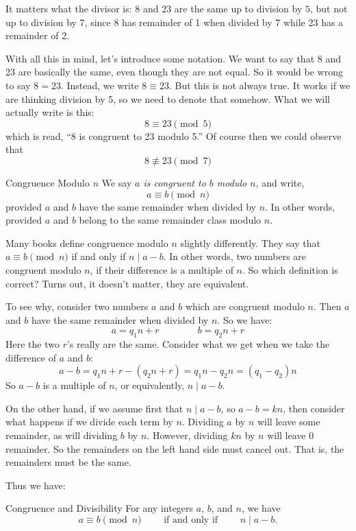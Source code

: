 \documentclass[12pt]{article}
\begin{document}
It matters what the divisor is: $8$ and $23$ are the same up to division by $5$, but not up to division by $7$, since $8$ has remainder of 1 when divided by 7 while 23 has a remainder of 2.  

With all this in mind, let's introduce some notation.  We want to say that $8$ and 23 are basically the same, even though they are not equal.  So it would be wrong to say $8 = 23$.  Instead, we write $8 \equiv 23$.  But this is not always true.  It works if we are thinking division by 5, so we need to denote that somehow.  What we will actually write is this:
\[8 \equiv 23 \pmod{5}\]
which is read, ``8 is congruent to 23 modulo 5.''  Of course then we could observe that
\[8 \not\equiv 23 \pmod{7}\]

\begin{defbox}{Congruence Modulo $n$}
	We say {\em $a$ is  congruent to $b$ modulo $n$}, and write,
	\[a \equiv b \pmod{n}\]
	provided $a$ and $b$ have the same remainder when divided by $n$.  In other words, provided $a$ and $b$ belong to the same remainder class modulo $n$.
\end{defbox}

Many books define congruence modulo $n$ slightly differently.  They say that $a \equiv b \pmod{n}$ if and only if $n \mid a-b$.  In other words, two numbers are congruent modulo $n$, if their difference is a multiple of $n$.  So which definition is correct?  Turns out, it doesn't matter, they are equivalent.

To see why, consider two numbers $a$ and $b$ which are congruent modulo $n$.  Then $a$ and $b$ have the same remainder when divided by $n$. So we have:
\[a = q_1 n + r \qquad\qquad b = q_2 n + r\]
Here the two $r$'s really are the same.  Consider what we get when we take the difference of $a$ and $b$:
\[a-b = q_1n + r - (q_2n + r) = q_1n - q_2 n = (q_1-q_2)n\]
So $a-b$ is a multiple of $n$, or equivalently, $n \mid a-b$.

On the other hand, if we assume first that $n \mid a-b$, so $a-b = kn$, then consider what happens if we divide each term by $n$.  Dividing $a$ by $n$ will leave some remainder, as will dividing $b$ by $n$.  However, dividing $kn$ by $n$ will leave 0 remainder.  So the remainders on the left hand side must cancel out.  That is, the remainders must be the same.

Thus we have:

\begin{defbox}{Congruence and Divisibility}
	For any integers $a$, $b$, and $n$, we have
	\[a \equiv b \pmod{n} \qquad \mbox{ if and only if } \qquad n \mid a-b.\]
\end{defbox}
\end{document}
